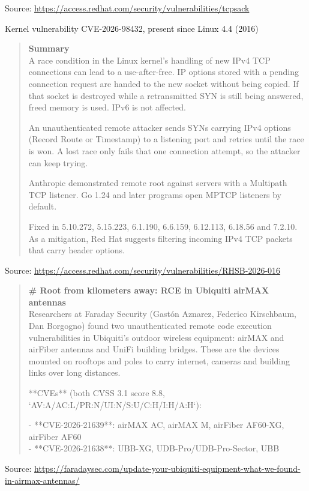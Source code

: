 \documentclass[Screen16to9,17pt]{foils}
\begin{document}
Source: {\footnotesize\url{https://access.redhat.com/security/vulnerabilities/tcpsack}}



Kernel vulnerability CVE-2026-98432, present since Linux 4.4 (2016)

\begin{quote}\footnotesize{\bf
Summary}\\
A race condition in the Linux kernel's handling of new IPv4 TCP connections can lead to a use-after-free. IP options stored with a pending connection request are handed to the new socket without being copied. If that socket is destroyed while a retransmitted SYN is still being answered, freed memory is used. IPv6 is not affected.

An unauthenticated remote attacker sends SYNs carrying IPv4 options (Record Route or Timestamp) to a listening port and retries until the race is won. A lost race only fails that one connection attempt, so the attacker can keep trying.

Anthropic demonstrated remote root against servers with a Multipath TCP listener. Go 1.24 and later programs open MPTCP listeners by default.

Fixed in 5.10.272, 5.15.223, 6.1.190, 6.6.159, 6.12.113, 6.18.56 and 7.2.10. As a mitigation, Red Hat suggests filtering incoming IPv4 TCP packets that carry header options.
\end{quote}

Source: {\footnotesize\url{https://access.redhat.com/security/vulnerabilities/RHSB-2026-016}}


\begin{quote}\small{\bf
\# Root from kilometers away: RCE in Ubiquiti airMAX antennas}\\
Researchers at Faraday Security (Gastón Aznarez, Federico Kirschbaum, Dan Borgogno) found two unauthenticated remote code execution vulnerabilities in Ubiquiti's outdoor wireless equipment: airMAX and airFiber antennas and UniFi building bridges. These are the devices mounted on rooftops and poles to carry internet, cameras and building links over long distances.

**CVEs** (both CVSS 3.1 score 8.8, `AV:A/AC:L/PR:N/UI:N/S:U/C:H/I:H/A:H`):

- **CVE-2026-21639**: airMAX AC, airMAX M, airFiber AF60-XG, airFiber AF60\\
- **CVE-2026-21638**: UBB-XG, UDB-Pro/UDB-Pro-Sector, UBB

\end{quote}
Source: \url{https://faradaysec.com/update-your-ubiquiti-equipment-what-we-found-in-airmax-antennas/}
\end{document}
